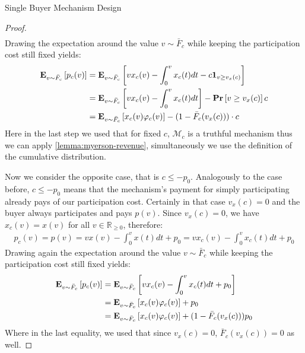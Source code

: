 \documentclass[11pt,a4paper]{article}
\newcommand{\RR}{\ensuremath{\mathbb{R}}}
\renewcommand{\Pr}[1]{\mbox{\rm\bf Pr}\left[#1\right]}
\newcommand{\Ex}[2][]{\mbox{\rm\bf E}_{#1}\left[#2\right]}
\newcommand{\1}[1]{\mbox{\rm\bf 1}_{#1}}
\begin{document}
\begin{section}{Single Buyer Mechanism Design}
\begin{proof}
\begin{align*}
     \end{align*}
     Drawing the expectation around the value $v \sim \bar{F}_c$ while keeping the participation cost still fixed yields:
     \begin{equation}
         \label{eq:expected-revenue-first-case}
         \begin{aligned}
             \Ex[v \sim \bar{F}_c]{p_c(v)} & = \Ex[v \sim \bar{F}_c]{v x_c(v) - \int_0^v x_c(t) dt - c \1{v \geq v_x(c)}}   \\
                                           & = \Ex[v \sim \bar{F}_c]{v x_c(v) - \int_0^v x_c(t) dt} - \Pr{v \geq v_x(c)}c   \\
                                           & = \Ex[v \sim \bar{F}_c]{x_c(v) \varphi_c(v)} - (1 - \bar{F}_c(v_x(c))) \cdot c \\
         \end{aligned}
     \end{equation}
     Here in the last step we used that for fixed $c$, $\mathcal{M}_c$ is a truthful mechanism thus we can apply \cref{lemma:myerson-revenue}, simultaneously we use the definition of the cumulative distribution.

     Now we consider the opposite case, that is $c \leq -p_0$.
     Analogously to the case before, $c \leq -p_0$ means that the mechanism's payment for simply participating already pays of our participation cost.
     Certainly in that case $v_x(c) = 0$ and the buyer always participates and pays $p(v)$.
     Since $v_x(c) = 0$, we have $x_c(v) = x(v)$ for all $v \in \RR_{\geq 0}$, therefore:
     \begin{align*}
         p_c(v) = p(v) = v x(v) - \int_0^v x(t)dt + p_0 = v x_c(v) - \int_0^v x_c(t)dt + p_0
     \end{align*}
     Drawing again the expectation around the value $v \sim \bar{F}_c$ while keeping the participation cost still fixed yields:
     \begin{equation}
         \label{eq:expected-revenue-second-case}
         \begin{aligned}
             \Ex[v \sim \bar{F}_c]{p_c(v)} & = \Ex[v \sim \bar{F}_c]{v x_c(v) - \int_0^v x_c(t)dt + p_0}                  \\
                                           & = \Ex[v \sim \bar{F}_c]{x_c(v) \varphi_c(v)} + p_0                           \\
                                           & = \Ex[v \sim \bar{F}_c]{x_c(v) \varphi_c(v)} + (1 - \bar{F}_{c}(v_x(c))) p_0
         \end{aligned}
     \end{equation}
     Where in the last equality, we used that since $v_x(c) = 0$, $\bar{F}_{c}(v_x(c)) = 0$ as well.


\end{proof}
\end{section}
\end{document}
